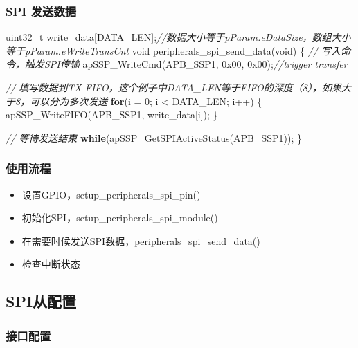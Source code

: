 \documentclass[
  12pt,
]{book}
\newenvironment{Shaded}{\begin{snugshade}}{\end{snugshade}}
\newcommand{\BaseNTok}[1]{\textcolor[rgb]{0.00,0.00,0.81}{#1}}
\newcommand{\CommentTok}[1]{\textcolor[rgb]{0.56,0.35,0.01}{\textit{#1}}}
\newcommand{\ControlFlowTok}[1]{\textcolor[rgb]{0.13,0.29,0.53}{\textbf{#1}}}
\newcommand{\DataTypeTok}[1]{\textcolor[rgb]{0.13,0.29,0.53}{#1}}
\newcommand{\DecValTok}[1]{\textcolor[rgb]{0.00,0.00,0.81}{#1}}
\newcommand{\NormalTok}[1]{#1}
\providecommand{\tightlist}{%
  \setlength{\itemsep}{0pt}\setlength{\parskip}{0pt}}
\begin{document}
\hypertarget{spi-ux53d1ux9001ux6570ux636e}{%
\subsubsection{SPI 发送数据}\label{spi-ux53d1ux9001ux6570ux636e}}

\begin{Shaded}
\begin{Highlighting}[]
\DataTypeTok{uint32_t}\NormalTok{ write_data[DATA_LEN];}\CommentTok{//数据大小等于pParam.eDataSize，数组大小等于pParam.eWriteTransCnt}
\DataTypeTok{void}\NormalTok{ peripherals_spi_send_data(}\DataTypeTok{void}\NormalTok{)}
\NormalTok{\{}
  \CommentTok{// 写入命令，触发SPI传输}
\NormalTok{  apSSP_WriteCmd(APB_SSP1, }\BaseNTok{0x00}\NormalTok{, }\BaseNTok{0x00}\NormalTok{);}\CommentTok{//trigger transfer}
  
  \CommentTok{// 填写数据到TX FIFO，这个例子中DATA_LEN等于FIFO的深度（8），如果大于8，可以分为多次发送}
  \ControlFlowTok{for}\NormalTok{(i = }\DecValTok{0}\NormalTok{; i < DATA_LEN; i++)}
\NormalTok{  \{}
\NormalTok{    apSSP_WriteFIFO(APB_SSP1, write_data[i]);}
\NormalTok{  \}}

  \CommentTok{// 等待发送结束}
  \ControlFlowTok{while}\NormalTok{(apSSP_GetSPIActiveStatus(APB_SSP1));}
\NormalTok{\}}
\end{Highlighting}
\end{Shaded}

\hypertarget{ux4f7fux7528ux6d41ux7a0b-8}{%
\subsubsection{使用流程}\label{ux4f7fux7528ux6d41ux7a0b-8}}

\begin{itemize}
\tightlist
\item
  设置GPIO，setup\_peripherals\_spi\_pin()
\item
  初始化SPI，setup\_peripherals\_spi\_module()
\item
  在需要时候发送SPI数据，peripherals\_spi\_send\_data()
\item
  检查中断状态
\end{itemize}

\hypertarget{spiux4eceux914dux7f6e}{%
\subsection{SPI从配置}\label{spiux4eceux914dux7f6e}}

\hypertarget{ux63a5ux53e3ux914dux7f6e-1}{%
\subsubsection{接口配置}\label{ux63a5ux53e3ux914dux7f6e-1}}
\end{document}
